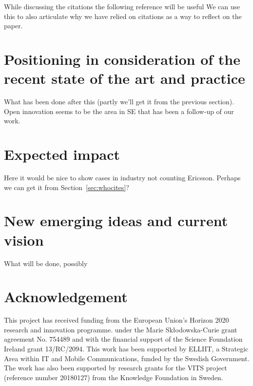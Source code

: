 \documentclass[sigplan]{acmart}
\begin{document}
While discussing the citations the following reference will be useful \cite{penders2018ten} We can use this to also articulate why we have relied on citations as a way to reflect on the paper.


\section{Positioning in consideration of the recent state of the art and practice}\label{sec:soa} 
What has been done after this (partly we'll get it from the previous section).
Open innovation seems to be the area in SE that has been a follow-up of our work.

\section{Expected impact}\label{sec:impact}
Here it would be nice to show cases in industry not counting Ericsson. Perhaps we can get it from Section~\ref{sec:whocites}?



\section{New emerging ideas and current vision}\label{sec:fw} 
What will be done, possibly

\section*{Acknowledgement}
This project has received funding from the European Union's Horizon 2020 research and innovation programme. under the Marie Skłodowska-Curie grant agreement No. 754489 and with the financial support of the Science Foundation Ireland grant 13/RC/2094. This work has been supported by ELLIIT, a Strategic Area within IT and Mobile Communications, funded by the Swedish Government. The work has also been supported by research grants for the VITS project (reference number 20180127) from the Knowledge Foundation in Sweden.









\end{document}
